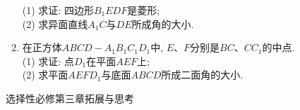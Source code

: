 \documentclass[10pt,a4paper]{article}
\begin{document}
\begin{enumerate}[1.]
\begin{center}
\end{center}
(1) 求证: 四边形$B_1EDF$是菱形;\\
(2) 求异面直线$A_1C$与$DE$所成角的大小.
\vspace*{3cm}
\item 在正方体$ABCD-A_1B_1C_1D_1$中, $E$、$F$分别是$BC$、$CC_1$的中点.\\
(1) 求证: 点$D_1$在平面$AEF$上;\\
(2) 求平面$AEFD_1$与底面$ABCD$所成二面角的大小. 
\vspace*{3cm}
\end{enumerate}

选择性必修第三章拓展与思考

\begin{enumerate}[1.]


\end{enumerate}
\end{document}
